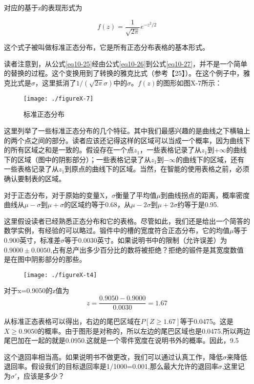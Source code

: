 \documentclass[cn,11pt,chinese]{elegantbook}
\begin{document}
{对应的基于z的表现形式为


\begin{equation}\label{eq10-27}
f(z)=\frac{1}{\sqrt{2\pi}}e^{-z^2/2} 
\end{equation}


这个式子被叫做标准正态分布，它是所有正态分布表格的基本形式。

读者注意到，从公式\ref{eq10-25}经由公式\ref{eq10-26}到公式\ref{eq10-27}，并不是一个简单的替换的过程。这个变换用到了转换的雅克比式（参考【25】）。在这个例子中，雅克比式是$\sigma$，这里抵消了$1/(\sqrt{2\pi}\sigma)$中的$\sigma$。$f(z)$的图形如图X-7所示：

\begin{figure}[htpb]
	\centering
	\texttt{[image: ./figureX-7]}
	\caption{标准正态分布}
	\label{fig10-7}
\end{figure}


这里列举了一些标准正态分布的几个特征。其中我们最感兴趣的是曲线之下横轴上的两个点之间的部分。读者应该还记得这样的区域可以当成一个概率，因为曲线下的所有区域之和是一致的。假设存在一个点$z_1$，一些表格记录了从$z_1$到$+\infty$的曲线下的区域（图中的阴影部分）；一些表格记录了从$z_1$到$-\infty$的曲线下的区域，还有一些表格记录了从$z_1$到原点的曲线下的区域。当然，在智能的使用表格之前，必须确认要制表的区域。

对于正态分布，对于原始的变量X，$\sigma$衡量了平均值$\mu$到曲线拐点的距离，概率密度曲线从$\mu-\sigma$到$\mu+\sigma$的区域约等于0.68，从$\mu-2\sigma$到$\mu+2\sigma$约等于是0.95.

这里假设读者已经熟悉正态分布和它的表格。尽管如此，我们还是给出一个简答的数学实例，有经验的可以略过。锻件中的槽的宽度符合正态分布，它的均值$\mu$等于0.900英寸，标准差$\sigma$等于0.0030英寸。如果说明书中的限制（允许误差）为$0.9000\pm 0.0050$,占有总产出多少百分比的数将被拒绝？拒绝的锻件是其宽度数值是在图中阴影部分的那些。

\begin{figure}
	\texttt{[image: ./figureX-t4]}
\end{figure}


对于x=0.9050的z值为
$$z=\frac{0.9050-0.9000}{0.0030}=1.67$$

从标准正态表格可以得出，右边的尾巴区域在$P[Z\geq 1.67]$等于0.0475。这是$X\geq 0.9050$的概率。由于图形是对称的，所以左边的尾巴区域也是0.0475.所以两边尾巴加在一起的就是0.0950.这就是一个零件宽度在说明书外的概率。因此，9.5%

这个退回率相当高。如果说明书不做更改，我们可以通过认真工作，降低$\sigma$来降低退回率。假设我们的目标退回率是1/1000=0.001,那么最大允许的退回率$\sigma$,这里记为$\sigma '$，应该是多少？


}
\end{document}
